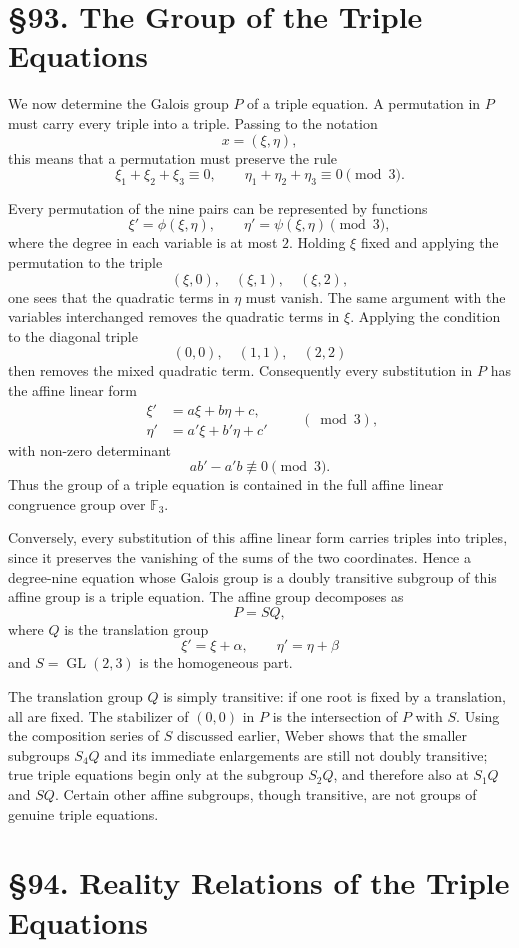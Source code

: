 \documentclass[11pt,a4paper]{book}
\newcommand{\webersection}[2]{\clearpage\section*{\S #1. #2}}
\DeclareMathOperator{\GL}{GL}
\begin{document}
\webersection{93}{The Group of the Triple Equations}

We now determine the Galois group \(P\) of a triple equation.  A permutation in \(P\) must carry every triple into a triple.  Passing to the notation
\[
x=(\xi,\eta),
\]
this means that a permutation must preserve the rule
\[
\xi_1+\xi_2+\xi_3\equiv0,\qquad
\eta_1+\eta_2+\eta_3\equiv0\pmod3.
\]

Every permutation of the nine pairs can be represented by functions
\[
\xi'=\phi(\xi,\eta),\qquad \eta'=\psi(\xi,\eta)\pmod3,
\]
where the degree in each variable is at most \(2\).  Holding \(\xi\) fixed and applying the permutation to the triple
\[
(\xi,0),\quad(\xi,1),\quad(\xi,2),
\]
one sees that the quadratic terms in \(\eta\) must vanish.  The same argument with the variables interchanged removes the quadratic terms in \(\xi\).  Applying the condition to the diagonal triple
\[
(0,0),\quad(1,1),\quad(2,2)
\]
then removes the mixed quadratic term.  Consequently every substitution in \(P\) has the affine linear form
\[
\begin{aligned}
\xi'&=a\xi+b\eta+c,\\
\eta'&=a'\xi+b'\eta+c'
\end{aligned}
\qquad(\bmod 3),
\]
with non-zero determinant
\[
ab'-a'b\not\equiv0\pmod3.
\]
Thus the group of a triple equation is contained in the full affine linear congruence group over \(\mathbb F_3\).

Conversely, every substitution of this affine linear form carries triples into triples, since it preserves the vanishing of the sums of the two coordinates.  Hence a degree-nine equation whose Galois group is a doubly transitive subgroup of this affine group is a triple equation.  The affine group decomposes as
\[
P=SQ,
\]
where \(Q\) is the translation group
\[
\xi'=\xi+\alpha,\qquad \eta'=\eta+\beta
\]
and \(S=\GL(2,3)\) is the homogeneous part.

The translation group \(Q\) is simply transitive: if one root is fixed by a translation, all are fixed.  The stabilizer of \((0,0)\) in \(P\) is the intersection of \(P\) with \(S\).  Using the composition series of \(S\) discussed earlier, Weber shows that the smaller subgroups \(S_4Q\) and its immediate enlargements are still not doubly transitive; true triple equations begin only at the subgroup \(S_2Q\), and therefore also at \(S_1Q\) and \(SQ\).  Certain other affine subgroups, though transitive, are not groups of genuine triple equations.

\webersection{94}{Reality Relations of the Triple Equations}
\end{document}
